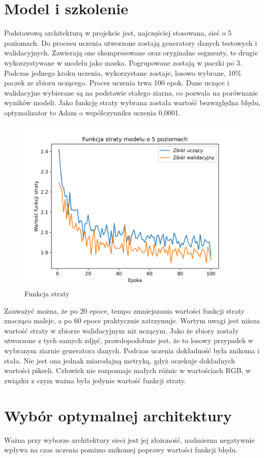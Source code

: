 \documentclass[a4paper, 12pt]{article}
\begin{document}
\section{Model i szkolenie}
Podstawową architekturą w projekcie jest, najczęściej stosowana, sieć o 5 poziomach. \cite{ronneberger2015unet}
Do procesu uczenia utworzone zostają generatory danych testowych i walidacyjnych.
Zawierają one skompresowane oraz oryginalne segmenty, te drugie wykorzystywane w modelu jako maska.
Pogrupowane zostają w paczki po 3.
Podczas jednego kroku uczenia, wykorzystane zostaje, losowo wybrane, 10\% paczek ze zbioru uczącego.
Proces uczenia trwa 100 epok.
Dane uczące i walidacyjne wybierane są na podstawie stałego ziarna, co pozwala na porównanie wyników modeli.
Jako funkcję straty wybrana została wartość bezwzględna błędu, optymalizator to Adam o współczynniku uczenia 0,0001.

\begin{figure}[h!]
\begin{center}
	\includegraphics[width=0.7\columnwidth]{loss5.png}
	\caption{Funkcja straty}
\end{center}
\end{figure}

Zauważyć można, że po 20 epoce, tempo zmniejszania wartości funkcji straty znacząco maleje,
a po 60 epoce praktycznie zatrzymuje.
Wartym uwagi jest niższa wartość straty w zbiorze walidacyjnym niż uczącym. Jako że zbiory zostały utworzone z tych samych zdjęć,
prawdopodobnie jest, że to losowy przypadek w wybranym ziarnie generatora danych.
Podczas uczenia dokładność była znikoma i stała. Nie jest ona jednak miarodajną metryką, gdyż oczekuje dokładnych wartości pikseli.
Człowiek nie rozpoznaje małych różnic w wartościach RGB, w związku z czym ważna była jedynie wartość funkcji straty.
\newpage
\section{Wybór optymalnej architektury}
Ważna przy wyborze architektury sieci jest jej złożoność, nadmierna negatywnie wpływa na czas uczenia pomimo znikomej poprawy wartości funkcji błędu.
\end{document}
